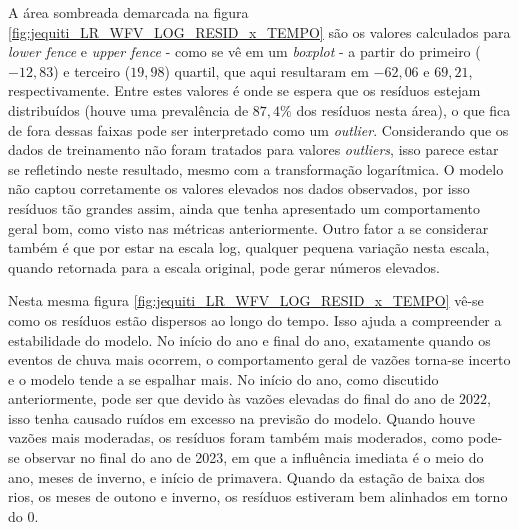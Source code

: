 A área sombreada demarcada na figura \ref{fig:jequiti_LR_WFV_LOG_RESID_x_TEMPO} são os valores calculados para \textit{lower fence} e \textit{upper fence} - como se vê em um \textit{boxplot} - a partir do primeiro ($-12,83$) e terceiro ($19,98$) quartil, que aqui resultaram em $-62,06$ e $69,21$, respectivamente. Entre estes valores é onde se espera que os resíduos estejam distribuídos (houve uma prevalência de $87,4\%$ dos resíduos nesta área), o que fica de fora dessas faixas pode ser interpretado como um \textit{outlier}. Considerando que os dados de treinamento não foram tratados para valores \textit{outliers}, isso parece estar se refletindo neste resultado, mesmo com a transformação logarítmica. O modelo não captou corretamente os valores elevados nos dados observados, por isso resíduos tão grandes assim, ainda que tenha apresentado um comportamento geral bom, como visto nas métricas anteriormente. Outro fator a se considerar também é que por estar na escala log, qualquer pequena variação nesta escala, quando retornada para a escala original, pode gerar números elevados.

Nesta mesma figura \ref{fig:jequiti_LR_WFV_LOG_RESID_x_TEMPO} vê-se como os resíduos estão dispersos ao longo do tempo. Isso ajuda a compreender a estabilidade do modelo. No início do ano e final do ano, exatamente quando os eventos de chuva mais ocorrem, o comportamento geral de vazões torna-se incerto e o modelo tende a se espalhar mais. No início do ano, como discutido anteriormente, pode ser que devido às vazões elevadas do final do ano de $2022$, isso tenha causado ruídos em excesso na previsão do modelo. Quando houve vazões mais moderadas, os resíduos foram também mais moderados, como pode-se observar no final do ano de 2023, em que a influência imediata é o meio do ano, meses de inverno, e início de primavera. Quando da estação de baixa dos rios, os meses de outono e inverno, os resíduos estiveram bem alinhados em torno do $0$.


